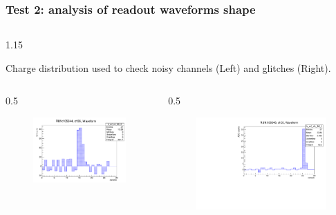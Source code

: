 \documentclass{beamer}
\begin{document}
\begin{frame}
\frametitle{Test 2: analysis of readout waveforms shape}
        \vspace{-4mm}
    \begin{columns}
\begin{column}{1.15\framewidth}
    \setlength{\leftmargini}{1.2em}
 \begin{itemize}
{\small \item Charge distribution used to check noisy channels (Left) and glitches (Right).}
  \end{itemize}
    \end{column}
    \end{columns}

     \vspace{-3mm}
    \begin{columns}
\begin{column}{0.5\framewidth}
         \begin{figure}[!h]
      \centering
      \hspace*{-1em}
    \includegraphics[width=0.95\columnwidth]{figures/pdf/noise.pdf}
     \label{fig:normalhits}
\end{figure}
\end{column}
\begin{column}{0.5\framewidth}
      \begin{figure}[!h]
      \centering
            \hspace*{-1em}
\includegraphics[width=0.95\columnwidth]{figures/pdf/glitch.pdf}

\end{figure}
\end{column}
\end{columns}
\end{frame}
\end{document}
